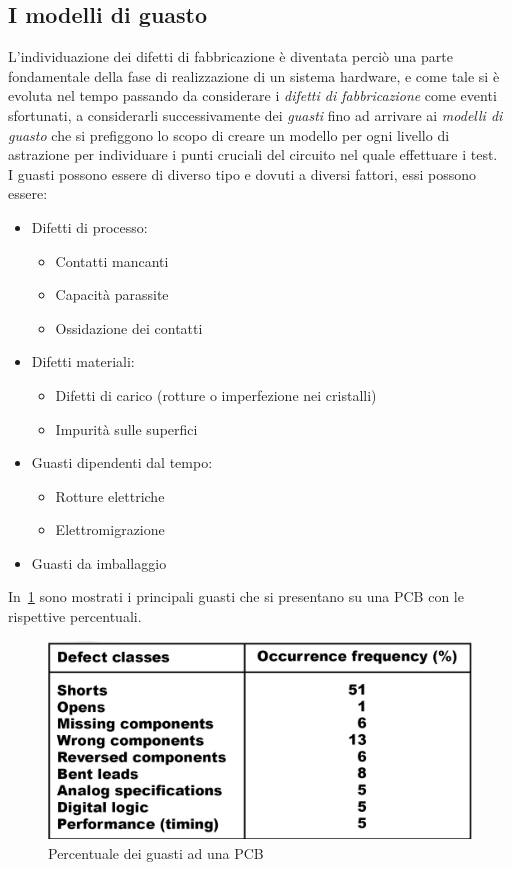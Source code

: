 \subsection{I modelli di guasto}
L'individuazione dei difetti di fabbricazione è diventata perciò una parte fondamentale della fase di realizzazione di un sistema hardware, e come tale si è evoluta nel tempo passando da considerare i \emph{difetti di fabbricazione} come eventi sfortunati, a considerarli successivamente dei \emph{guasti} fino ad arrivare ai \emph{modelli di guasto} che si prefiggono lo scopo di creare un modello per ogni livello di astrazione per individuare i punti cruciali del circuito nel quale effettuare i test.\\
I guasti possono essere di diverso tipo e dovuti a diversi fattori, essi possono essere:
\begin{itemize}
\item Difetti di processo:
\begin{itemize}
\item Contatti mancanti
\item Capacità parassite
\item Ossidazione dei contatti
\end{itemize}
\item Difetti materiali:
\begin{itemize}
\item Difetti di carico (rotture o imperfezione nei cristalli)
\item Impurità sulle superfici
\end{itemize}
\item Guasti dipendenti dal tempo:
\begin{itemize}
\item Rotture elettriche
\item Elettromigrazione
\end{itemize}
\item Guasti da imballaggio
\end{itemize}
In \figurename\,\ref{fig:tabguasti} sono mostrati i principali guasti che si presentano su una PCB con le rispettive percentuali.\\
\begin{figure}
\centering
\includegraphics[scale=0.3]{img/tabguasti.png}
\caption{Percentuale dei guasti ad una PCB}\label{fig:tabguasti}
\end{figure}
